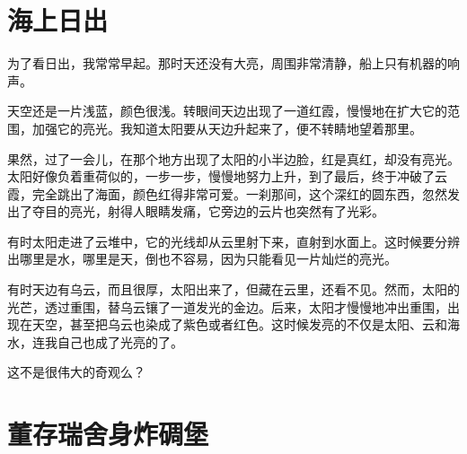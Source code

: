 \documentclass[12pt,UTF-8,openany]{ctexbook}
\begin{document}
\chapter{海上日出}

\begin{Large}
    
    为了看日出，我常常早起。那时天还没有大亮，周围非常清静，船上只有机器的响声。
    
    天空还是一片浅蓝，颜色很浅。转眼间天边出现了一道红霞，慢慢地在扩大它的范围，加强它的亮光。我知道太阳要从天边升起来了，便不转睛地望着那里。
    
    果然，过了一会儿，在那个地方出现了太阳的小半边脸，红是真红，却没有亮光。太阳好像负着重荷似的，一步一步，慢慢地努力上升，到了最后，终于冲破了云霞，完全跳出了海面，颜色红得非常可爱。一刹那间，这个深红的圆东西，忽然发出了夺目的亮光，射得人眼睛发痛，它旁边的云片也突然有了光彩。
    
    有时太阳走进了云堆中，它的光线却从云里射下来，直射到水面上。这时候要分辨出哪里是水，哪里是天，倒也不容易，因为只能看见一片灿烂的亮光。
    
    有时天边有乌云，而且很厚，太阳出来了，但藏在云里，还看不见。然而，太阳的光芒，透过重围，替乌云镶了一道发光的金边。后来，太阳才慢慢地冲出重围，出现在天空，甚至把乌云也染成了紫色或者红色。这时候发亮的不仅是太阳、云和海水，连我自己也成了光亮的了。
    
    这不是很伟大的奇观么？
    
\end{Large}

\chapter{董存瑞舍身炸碉堡}
\end{document}
